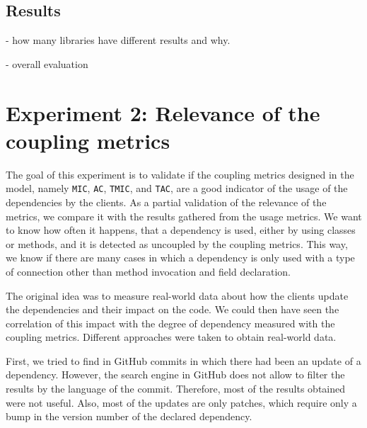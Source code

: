 \subsection{Results}

- how many libraries have different results and why.

- overall evaluation

\section{Experiment 2: Relevance of the coupling metrics}

The goal of this experiment is to validate if the coupling metrics designed in the model, namely \texttt{MIC}, \texttt{AC}, \texttt{TMIC}, and \texttt{TAC}, are a good indicator of the usage of the dependencies by the clients. As a partial validation of the relevance of the metrics, we compare it with the results gathered from the usage metrics. We want to know how often it happens, that a dependency is used, either by using classes or methods, and it is detected as uncoupled by the coupling metrics. This way, we know if there are many cases in which a dependency is only used with a type of connection other than method invocation and field declaration.


The original idea was to measure real-world data about how the clients update the dependencies and their impact on the code. We could then have seen the correlation of this impact with the degree of dependency measured with the coupling metrics. Different approaches were taken to obtain real-world data.

First, we tried to find in GitHub commits in which there had been an update of a dependency. However, the search engine in GitHub does not allow to filter the results by the language of the commit. Therefore, most of the results obtained were not useful. Also, most of the updates are only patches, which require only a bump in the version number of the declared dependency.

